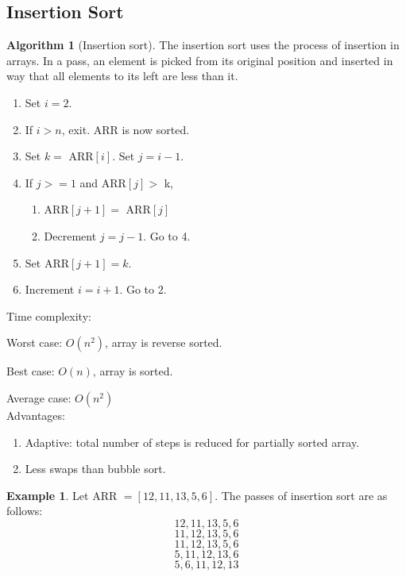 \documentclass[10pt, a4paper]{extarticle}
\theoremstyle{definition}
\newtheorem{alg}{Algorithm}
\newtheorem{eg}{Example}
\begin{document}
\subsection{Insertion Sort}
\begin{alg}[Insertion sort]
	The insertion sort uses the process of insertion in arrays. In a pass, an element is picked from its original position and inserted in way that all elements to its left are less than it.
	\begin{enumerate}
		\item Set $i=2$.
		\item If $i>n$, exit. ARR is now sorted.
		\item Set $k=$ ARR$[i]$. Set $j=i-1$.
		\item If $j>=1$ and ARR$[j]>$ k,
		      \begin{enumerate}
			      \item ARR$[j+1]=$ ARR$[j]$
			      \item Decrement $j=j-1$. Go to 4.
		      \end{enumerate}
		\item Set ARR$[j+1]=k$.
		\item Increment $i=i+1$. Go to 2.
	\end{enumerate}
	Time complexity:

	Worst case: $O(n^2)$, array is reverse sorted.

	Best case: $O(n)$, array is sorted.

	Average case: $O(n^2)$
	\hfill\\
	Advantages:
	\begin{enumerate}
		\item Adaptive: total number of steps is reduced for partially sorted array.
		\item Less swaps than bubble sort.
	\end{enumerate}
\end{alg}
\begin{eg}
	Let ARR $=[12,11,13,5,6]$. The passes of insertion sort are as follows:
	\[12,\boxed{11},13,5,6\]
	\[11,12,\boxed{13},5,6\]
	\[11,12,13,\boxed{5},6\]
	\[5,11,12,13,\boxed{6}\]
	\[5,6,11,12,13\]
\end{eg}
\end{document}
